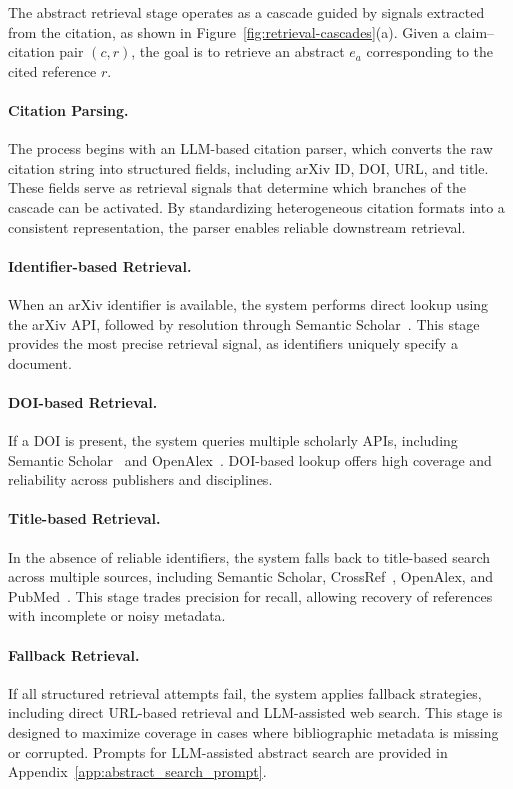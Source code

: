 \documentclass{article}
\theoremstyle{plain}
\theoremstyle{definition}
\theoremstyle{remark}
\begin{document}
The abstract retrieval stage operates as a cascade guided by signals extracted from the citation, as shown in Figure~\ref{fig:retrieval-cascades}(a). Given a claim--citation pair $(c, r)$, the goal is to retrieve an abstract $e_a$ corresponding to the cited reference $r$.

\paragraph{Citation Parsing.}
The process begins with an LLM-based citation parser, which converts the raw citation string into structured fields, including arXiv ID, DOI, URL, and title. These fields serve as retrieval signals that determine which branches of the cascade can be activated. By standardizing heterogeneous citation formats into a consistent representation, the parser enables reliable downstream retrieval.

\paragraph{Identifier-based Retrieval.}
When an arXiv identifier is available, the system performs direct lookup using the arXiv API, followed by resolution through Semantic Scholar~\cite{kinney2023semantic}. This stage provides the most precise retrieval signal, as identifiers uniquely specify a document.

\paragraph{DOI-based Retrieval.}
If a DOI is present, the system queries multiple scholarly APIs, including Semantic Scholar~\cite{kinney2023semantic} and OpenAlex~\cite{priem2022openalex}. DOI-based lookup offers high coverage and reliability across publishers and disciplines.

\paragraph{Title-based Retrieval.}
In the absence of reliable identifiers, the system falls back to title-based search across multiple sources, including Semantic Scholar, CrossRef~\cite{hendricks2020crossref}, OpenAlex, and PubMed~\cite{sayers2022pubmed}. This stage trades precision for recall, allowing recovery of references with incomplete or noisy metadata.

\paragraph{Fallback Retrieval.}
If all structured retrieval attempts fail, the system applies fallback strategies, including direct URL-based retrieval and LLM-assisted web search. This stage is designed to maximize coverage in cases where bibliographic metadata is missing or corrupted. Prompts for LLM-assisted abstract search are provided in Appendix~\ref{app:abstract_search_prompt}.
\end{document}
